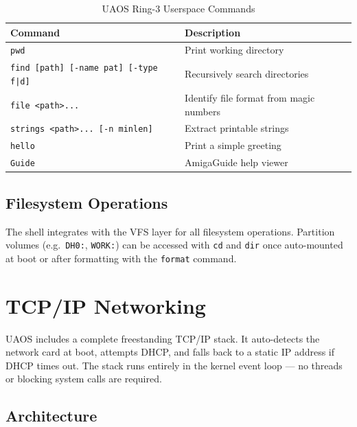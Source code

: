 \documentclass[11pt,a4paper]{report}
\begin{document}
\begin{table}[h]
    \centering
    \begin{tabular}{ll}
        \toprule
        \textbf{Command} & \textbf{Description} \\
        \midrule
        \texttt{pwd} & Print working directory \\
        \texttt{find [path] [-name pat] [-type f|d]} & Recursively search directories \\
        \texttt{file <path>...} & Identify file format from magic numbers \\
        \texttt{strings <path>... [-n minlen]} & Extract printable strings \\
        \texttt{hello} & Print a simple greeting \\
        \texttt{Guide} & AmigaGuide help viewer \\
        \bottomrule
    \end{tabular}
    \caption{UAOS Ring-3 Userspace Commands}
    \label{tab:userspacecmds}
\end{table}

\section{Filesystem Operations}

The shell integrates with the VFS layer for all filesystem operations.
Partition volumes (e.g.\ \texttt{DH0:}, \texttt{WORK:}) can be accessed
with \texttt{cd} and \texttt{dir} once auto-mounted at boot or after
formatting with the \texttt{format} command.

\chapter{TCP/IP Networking}
\label{ch:networking}

UAOS includes a complete freestanding TCP/IP stack.  It auto-detects the
network card at boot, attempts DHCP, and falls back to a static IP address
if DHCP times out.  The stack runs entirely in the kernel event loop --- no
threads or blocking system calls are required.

\section{Architecture}
\end{document}
